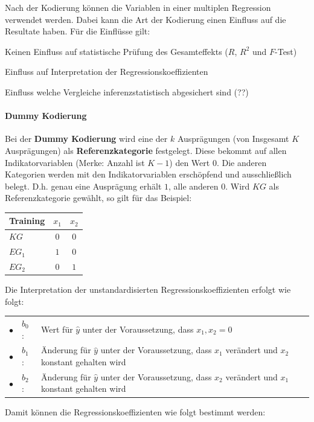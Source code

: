 \documentclass{article}
\numberwithin{equation}{section}
\begin{document}
Nach der Kodierung können die Variablen in einer multiplen Regression verwendet werden. Dabei kann die Art der Kodierung einen Einfluss auf die Resultate haben. Für die Einflüsse gilt:

\begin{compactitem}
\item Keinen Einfluss auf statistische Prüfung des Gesamteffekts ($R$, $R^2$ und $F$-Test)
\item Einfluss auf Interpretation der Regressionskoeffizienten
\item Einfluss welche Vergleiche inferenzstatistisch abgesichert sind (??)
\end{compactitem}

\paragraph{Dummy Kodierung}
\label{sec:dummy}

Bei der \textbf{Dummy Kodierung} wird eine der $k$ Ausprägungen (von Insgesamt $K$ Ausprägungen) als \textbf{Referenzkategorie} festgelegt. Diese bekommt auf allen Indikatorvariablen (Merke: Anzahl ist $K-1$) den Wert $0$. Die anderen Kategorien werden mit den Indikatorvariablen erschöpfend und ausschließlich belegt. D.h. genau eine Ausprägung erhält $1$, alle anderen $0$. Wird $KG$ als Referenzkategorie gewählt, so gilt für das Beispiel:

\begin{tabular}{lcc}
Training & $x_1$ & $x_2$\\
\hline
$KG$ & $0$ & $0$\\ 
$EG_1$ & $1$ & $0$\\
$EG_2$ & $0$ & $1$
\end{tabular}

Die Interpretation der unstandardisierten Regressionskoeffizienten erfolgt wie folgt:

\begin{tabular}{lll}
$\bullet$ & $\hat b_0$ : & Wert für $\hat y$ unter der Voraussetzung, dass $x_1, x_2 = 0$\\
$\bullet$ & $\hat b_1$ : & Änderung für $\hat y$ unter der Voraussetzung, dass $x_1$ verändert und $x_2$ konstant gehalten wird\\
$\bullet$ & $\hat b_2$ : & Änderung für $\hat y$ unter der Voraussetzung, dass $x_2$ verändert und $x_1$ konstant gehalten wird
\end{tabular}

Damit können die Regressionskoeffizienten wie folgt bestimmt werden:
\end{document}
